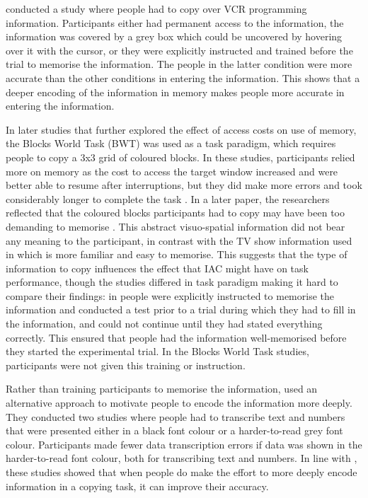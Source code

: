 \documentclass[11pt,oneside]{report}
\begin{document}
\citet{Gray2004} conducted a study where people had to copy over VCR programming information. Participants either had permanent access to the information, the information was covered by a grey box which could be uncovered by hovering over it with the cursor, or they were explicitly instructed and trained before the trial to memorise the information. The people in the latter condition were more accurate than the other conditions in entering the information. This shows that a deeper encoding of the information in memory makes people more accurate in entering the information. 

In later studies that further explored the effect of access costs on use of memory, the Blocks World Task (BWT) was used as a task paradigm, which requires people to copy a 3x3 grid of coloured blocks. In these studies, participants relied more on memory as the cost to access the target window increased and were better able to resume after interruptions, but they did make more errors and took considerably longer to complete the task \citep{Morgan2009}. In a later paper, the researchers reflected that the coloured blocks participants had to copy may have been too demanding to memorise \citep{Waldron2011}. This abstract visuo-spatial information did not bear any meaning to the participant, in contrast with the TV show information used in \citet{Gray2004} which is more familiar and easy to memorise. This suggests that the type of information to copy influences the effect that IAC might have on task performance, though the studies differed in task paradigm making it hard to compare their findings: in \citet{Gray2004} people were explicitly instructed to memorise the information and conducted a test prior to a trial during which they had to fill in the information, and could not continue until they had stated everything correctly. This ensured that people had the information well-memorised before they started the experimental trial. In the Blocks World Task studies, participants were not given this training or instruction.

Rather than training participants to memorise the information, \citet{Soboczenski2013} used an alternative approach to motivate people to encode the information more deeply. They conducted two studies where people had to transcribe text and numbers that were presented either in a black font colour or a harder-to-read grey font colour. Participants made fewer data transcription errors if data was shown in the harder-to-read font colour, both for transcribing text and numbers. In line with \citet{Gray2004}, these studies showed that when people do make the effort to more deeply encode information in a copying task, it can improve their accuracy.
\end{document}
